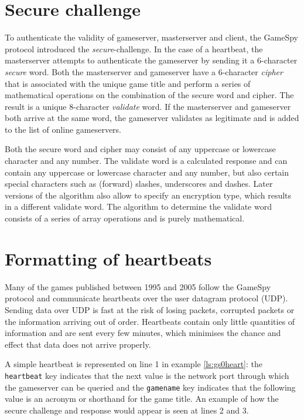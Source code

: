 \section{Secure challenge}
To authenticate the validity of gameserver, masterserver and client, the GameSpy protocol introduced the \emph{secure}-challenge. In the case of a heartbeat, the masterserver attempts to authenticate the gameserver by sending it a 6-character \emph{secure} word. Both the masterserver and gameserver have a 6-character \emph{cipher} that is associated with the unique game title and perform a series of mathematical operations on the combination of the secure word and cipher. The result is a unique 8-character \emph{validate} word. If the masterserver and gameserver both arrive at the same word, the gameserver validates as legitimate and is added to the list of online gameservers.

Both the secure word and cipher may consist of any uppercase or lowercase character and any number. The validate word is a calculated response and can contain any uppercase or lowercase character and any number, but also certain special characters such as (forward) slashes, underscores and dashes. Later versions of the algorithm also allow to specify an encryption type, which results in a different validate word. The algorithm to determine the validate word consists of a series of array operations and is purely mathematical\cite{lam}.

\section{Formatting of heartbeats}
Many of the games published between 1995 and 2005 follow the GameSpy protocol\cite{gs0} and communicate heartbeats over the user datagram protocol (UDP). Sending data over UDP is fast at the risk of losing packets, corrupted packets or the information arriving out of order. Heartbeats contain only little quantities of information and are sent every few minutes, which minimises the chance and effect that data does not arrive properly.



A simple heartbeat is represented on line 1 in example \ref{ls:gs0heart}: the {\tt heartbeat} key indicates that the next value is the network port through which the gameserver can be queried and the {\tt gamename} key indicates that the following value is an acronym or shorthand for the game title. An example of how the secure challenge and response would appear is seen at lines 2 and 3.

